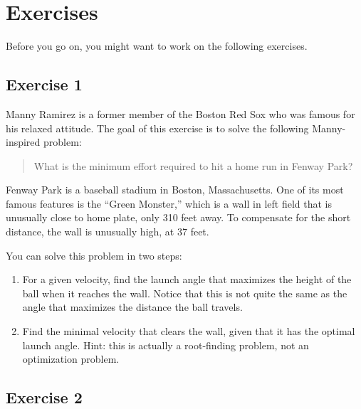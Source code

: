 \section{Exercises}

Before you go on, you might want to work on the following exercises.

\subsection{Exercise 1}


Manny Ramirez is a former member of the Boston Red Sox who was famous for his relaxed attitude.  The goal of this exercise is to solve the following Manny-inspired problem:

\begin{quote}
What is the minimum effort required to hit a home run in Fenway Park?
\end{quote}


Fenway Park is a baseball stadium in Boston, Massachusetts.  One of its most famous features is the ``Green Monster,'' which is a wall in left field that is unusually close to home plate, only 310 feet away.  To compensate for the short distance, the wall is unusually high, at 37 feet.


You can solve this problem in two steps:

\begin{enumerate}

\item For a given velocity, find the launch angle that maximizes the height of the ball when it reaches the wall.  Notice that this is not quite the same as the angle that maximizes the distance the ball travels.


\item Find the minimal velocity that clears the wall, given that it has the optimal launch angle.  Hint: this is actually a root-finding problem, not an optimization problem.

\end{enumerate}



\subsection{Exercise 2}
\label{golf}

